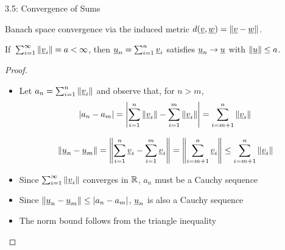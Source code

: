 \documentclass[10pt,letterpaper,english]{beamer}
\begin{document}
\begin{frame}{3.5: Convergence of Sums}


Banach space convergence via the induced metric $d(\underline{v}, \underline{w}) = \| \underline{v}-\underline{w} \|$.

\newcommand{\vtp}{\hspace{-0.02em}}
\begin{lemma}
If $\,\sum_{i=1}^\infty \| \vecnot{v}_i \| \vtp = \vtp a \vtp <\vtp \infty$, then $\vecnot{u}_n \vtp = \vtp \sum_{i=1}^n \vecnot{v}_i$ satisfies $\vecnot{u}_n \vtp \to \vtp \vecnot{u}$ with $\| \vecnot{u} \| \vtp \leq \vtp a$.
\end{lemma}

\begin{proof}
\begin{itemize}
\item Let $a_n = \sum_{i=1}^n \| \underline{v}_i \|$ and observe that, for $n\!>\!m$,
\[ |a_n - a_m| = \left| \sum_{i=1}^n \| \underline{v}_i \| - \sum_{i=1}^m \| \underline{v}_i \|  \right| = \sum_{i=m+1}^n \| \underline{v}_i \| \] 

\[ \|\underline{u}_n - \underline{u}_m \| = \left\| \sum_{i=1}^n \underline{v}_i - \sum_{i=1}^m \underline{v}_i  \right\| = \left\| \sum_{i=m+1}^n \underline{v}_i \right\| \leq \sum_{i=m+1}^n \| \underline{v}_i \| \] 

\item Since $\sum_{i=1}^\infty \| \underline{v}_i \|$ converges in $\mathbb{R}$, $a_n$ must be a Cauchy sequence \vspace{1mm}

\item Since $\|\underline{u}_n - \underline{u}_m\| \leq |a_n - a_m|$, $\underline{u}_n$ is also a Cauchy sequence \vspace{1mm}

\item The norm bound follows from the triangle inequality \hfill \qedhere

\end{itemize}

\end{proof}

\end{frame}
\end{document}
